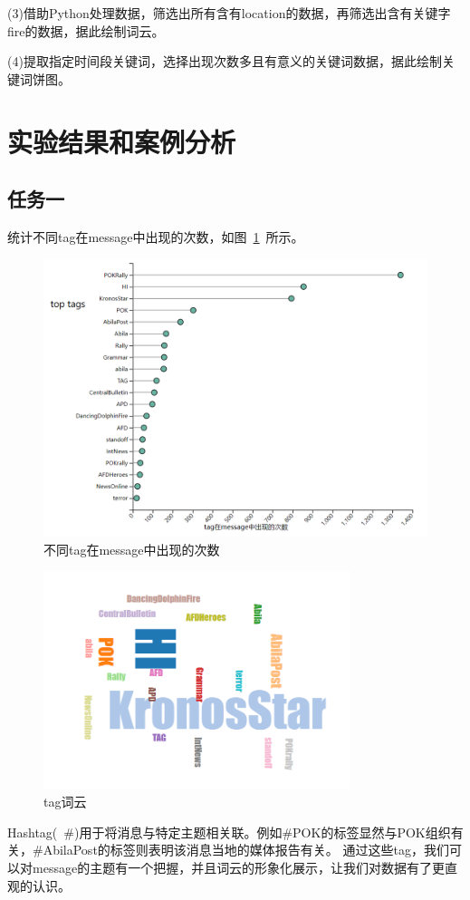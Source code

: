 \documentclass[a4paper]{article}
\begin{document}
(3)借助Python处理数据，筛选出所有含有location的数据，再筛选出含有关键字fire的数据，据此绘制词云。

(4)提取指定时间段关键词，选择出现次数多且有意义的关键词数据，据此绘制关键词饼图。

\section{实验结果和案例分析}\label{sub:ptxeva}
\subsection{任务一}

统计不同tag在message中出现的次数，如图~\ref{fig:1-tags}~所示。

\begin{figure}[H]
  \centering
  \includegraphics[width=1\textwidth]{images/1-tags.png}
  \caption{不同tag在message中出现的次数}\label{fig:1-tags}
  \vspace{\baselineskip}
\end{figure}
\begin{figure}[H]
  \centering
  \includegraphics[width=0.8\textwidth]{images/1-wordcloud.png}
  \caption{tag词云}\label{fig:1-wordcloud}
  \vspace{\baselineskip}
\end{figure}
Hashtag(~\#)用于将消息与特定主题相关联。例如\#POK的标签显然与POK组织有关，\#AbilaPost的标签则表明该消息当地的媒体报告有关。
通过这些tag，我们可以对message的主题有一个把握，并且词云的形象化展示，让我们对数据有了更直观的认识。
\end{document}
